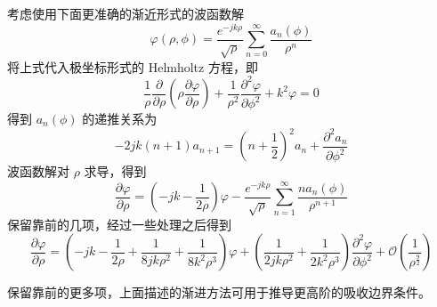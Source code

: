 \begin{solution}
    考虑使用下面更准确的渐近形式的波函数解
    \begin{equation*}
        \varphi(\rho,\phi)=
        \frac{e^{-jk\rho}}{\sqrt{\rho}}
        \sum_{n=0}^{\infty}\frac{a_n(\phi)}{\rho^n}
    \end{equation*}
    将上式代入极坐标形式的 Helmholtz 方程，即
    \begin{equation*}
        \frac{1}{\rho}\frac{\partial}{\partial \rho}
        \left(
            \rho\frac{\partial \varphi}{\partial \rho}
        \right)
        +\frac{1}{\rho^2}\frac{\partial^2 \varphi}{\partial \phi^2}
        +k^2\varphi=0
    \end{equation*}
    得到 $a_n(\phi)$ 的递推关系为
    \begin{equation*}
        -2jk(n+1)a_{n+1}=
        \left(n+\frac{1}{2}\right)^2
        a_n+\frac{\partial^2 a_n}{\partial \phi^2}
    \end{equation*}
    波函数解对 $\rho$ 求导，得到
    \begin{equation*}
        \frac{\partial \varphi}{\partial \rho}
        =\left(
            -jk-\frac{1}{2\rho}
        \right)\varphi
        -\frac{e^{-jk\rho}}{\sqrt{\rho}}
        \sum_{n=1}^{\infty}\frac{n a_n(\phi)}{\rho^{n+1}}
    \end{equation*}
    保留靠前的几项，经过一些处理之后得到
    \begin{equation*}
        \frac{\partial \varphi}{\partial \rho}
        =
        \left(
            -jk-\frac{1}{2\rho}
            +\frac{1}{8jk\rho^2}
            +\frac{1}{8k^2\rho^3}
        \right)\varphi
        +\left(
            \frac{1}{2jk\rho^2}
            +\frac{1}{2k^2\rho^3}
        \right)\frac{\partial^2 \varphi}{\partial \phi^2}
        +\mathcal{O}\left(\frac{1}{\rho^{\frac{9}{2}}}\right)
    \end{equation*}
\end{solution}

\par 保留靠前的更多项，上面描述的渐进方法可用于推导更高阶的吸收边界条件。

